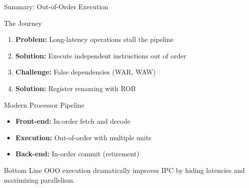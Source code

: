 \documentclass[aspectratio=169,12pt]{beamer}
\begin{document}
\begin{frame}{Summary: Out-of-Order Execution}
    \begin{block}{The Journey}
        \begin{enumerate}
            \item \textbf{Problem:} Long-latency operations stall the pipeline
            \item \textbf{Solution:} Execute independent instructions out of order
            \item \textbf{Challenge:} False dependencies (WAR, WAW)
            \item \textbf{Solution:} Register renaming with ROB
        \end{enumerate}
    \end{block}
    
    \begin{exampleblock}{Modern Processor Pipeline}
        \begin{itemize}
            \item \textbf{Front-end:} In-order fetch and decode
            \item \textbf{Execution:} Out-of-order with multiple units
            \item \textbf{Back-end:} In-order commit (retirement)
        \end{itemize}
    \end{exampleblock}
    
    \begin{alertblock}{Bottom Line}
        OOO execution dramatically improves IPC by hiding latencies and maximizing parallelism.
    \end{alertblock}
\end{frame}
\end{document}
